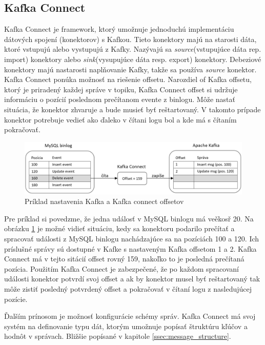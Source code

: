 \subsection{Kafka Connect}\label{kafka_connect}
Kafka Connect je framework, ktorý umožnuje jednoduchú implementáciu dátových spojení (konektorov) s Kafkou. Tieto konektory majú na starosti dáta, ktoré vstupujú alebo vystupujú z Kafky. Nazývajú sa \textit{source}(vstupujúce dáta rep. import) konektory alebo \textit{sink}(vysupujúce dáta resp. export) konektory. Debeziové konektory majú nastarosti naplňovanie Kafky, takže sa používa \textit{source} konektor. Kafka Connect ponúka možnosť na riešenie offsetu. Narozdiel of Kafka offsetu, ktorý je priradený každej správe v topiku, Kafka Connect offset si udržuje informáciu o pozícií poslednom prečítanom evente z binlogu. Môže nastať situácia, že konektor zhvaruje a bude musieť byť reštartovaný. V takomto prípade konektor potrebuje vedieť ako ďaleko v čítani logu bol a kde má s čítaním pokračovať. 

\begin{figure}[H]
\begin{center}
\includegraphics[width=15cm]{figures/kafka_offsets.PNG}
\caption{Príklad nastavenia Kafka a Kafka connect offsetov}
\label{fig:kafka_offsets}
\end{center}
\end{figure}

Pre príklad si povedzme, že jedna událosť v MySQL binlogu má veěkosř 20. Na obrázku \ref{fig:kafka_offsets} je možné vidieť situáciu, kedy sa konektoru podarilo prečítať a spracovať události z MySQL binlogu nachádzajúce sa na pozíciách 100 a 120. Ich príslušné správy sú dostupné v Kafke s nastaveným Kafka offsetom 1 a 2. Kafka Connect má v tejto sitácií offset rovný 159, nakoľko to je posledná prečítaná pozícia. Použitím Kafka Connect je zabezpečené, že po každom spracovaní události konektor potvrdí svoj offset a ak by konektor musel byť reštartovaný tak môže zistiť posledný potvrdený offset a pokračovať v čítaní logu z nasledujúcej pozície.

Ďalším prínosom je možnosť konfigurácie schémy správ. Kafka Connect má svoj systém na definovanie typu dát, ktorým umožnuje popísať štruktúru kľúčov a hodnôt v správach. Bližšie popísané v kapitole \ref{ssec:message_structure}.

